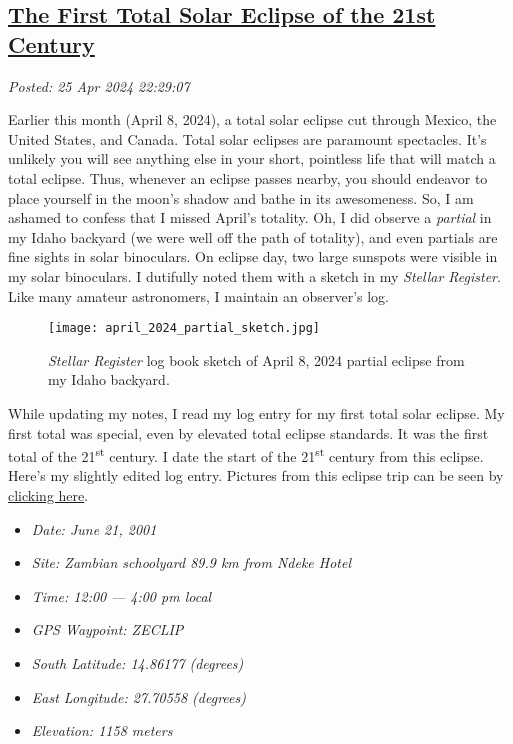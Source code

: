 %

\subsection*{\href{http://analyzethedatanotthedrivel.org/2024/04/25/the-first-total-solar-eclipse-of-the-21st-century/}{The First Total Solar Eclipse of the 21st Century}}


\noindent\emph{Posted: 25 Apr 2024 22:29:07}
\vspace{6pt}

Earlier this month (April 8, 2024), a total solar eclipse cut through
Mexico, the United States, and Canada. Total solar eclipses are
paramount spectacles. It's unlikely you will see anything else in your
short, pointless life that will match a total eclipse.
Thus, whenever an
eclipse passes nearby, you should endeavor to place yourself in the
moon's shadow and bathe in its awesomeness. So, I am ashamed to confess
that I missed April's totality. Oh, I did observe a \emph{partial} in my
Idaho backyard (we were well off the path of totality), and even
partials are fine sights in solar binoculars. On eclipse day, two large
sunspots were visible in my solar binoculars. I dutifully noted them
with a sketch in my \emph{Stellar Register}. Like many amateur
astronomers, I maintain an observer's log.

\captionsetup[figure]{labelformat=empty}
\begin{SCfigure}
\centering
\texttt{[image: april\_2024\_partial\_sketch.jpg]}
\caption{\emph{Stellar Register} log book sketch of April 8, 2024
partial eclipse from my Idaho backyard.}
\label{fig:8074X0}
\end{SCfigure}

While updating my notes, I read my log entry for my first total solar
eclipse. My first total was special, even by elevated total eclipse standards. It
was the first total of the 21\textsuperscript{st} century. I date the
start of the 21\textsuperscript{st} century from this eclipse. Here's my
slightly edited log entry. Pictures from this eclipse trip can be seen
by \href{https://conceptcontrol.smugmug.com/Trips/Overseas/Zambia-Eclipse-Trip-1}{clicking here}.


\begin{itemize}
\tightlist
\item[] %
  \emph{Date: June 21, 2001}
\item[]
  \emph{Site: Zambian schoolyard 89.9 km from Ndeke Hotel}
\item[]
  \emph{Time: 12:00} \emph{--- 4:00 pm local}
\item[]
  \emph{GPS Waypoint: ZECLIP}
\item[]
  \emph{South Latitude: 14.86177} \emph{(degrees)}
\item[]
  \emph{East Longitude: 27.70558 (degrees)}
\item[]
  \emph{Elevation: 1158 meters}
\end{itemize}

